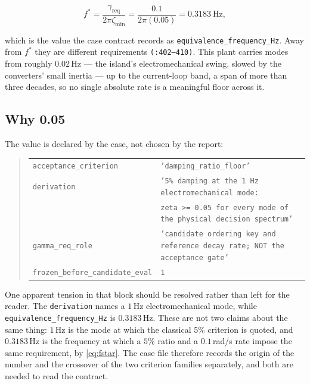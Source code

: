 \documentclass[12pt,a4paper]{article}
\theoremstyle{remark}
\newcommand{\zmin}{\zeta_{\min}}
\newcommand{\greq}{\gamma_{\mathrm{req}}}
\newcommand{\code}[1]{\texttt{\small #1}}
\begin{document}
\begin{equation}
f^{*} = \frac{\greq}{2\pi\zmin} = \frac{0.1}{2\pi(0.05)} = 0.3183\ \mathrm{Hz},
\label{eq:fstar}
\end{equation}

which is the value the case contract records as \code{equivalence\_frequency\_Hz}.
Away from $f^{*}$ they are different requirements \code{(:402--410)}. This plant
carries modes from roughly $0.02$\,Hz --- the island's electromechanical swing,
slowed by the converters' small inertia --- up to the current-loop band, a span
of more than three decades, so no single absolute rate is a meaningful floor
across it.

\subsection{Why 0.05}

The value is declared by the case, not chosen by the report:

\begin{quote}\small
\begin{tabular}{@{}ll@{}}
\code{acceptance\_criterion} & \code{'damping\_ratio\_floor'}\\
\code{derivation} & \code{'5\% damping at the 1\,Hz electromechanical mode:}\\
                 & \code{zeta >= 0.05 for every mode of the physical decision spectrum'}\\
\code{gamma\_req\_role} & \code{'candidate ordering key and reference decay rate; NOT the acceptance gate'}\\
\code{frozen\_before\_candidate\_eval} & \code{1}\\
\end{tabular}
\end{quote}

One apparent tension in that block should be resolved rather than left for the
reader. The \code{derivation} names a $1$\,Hz electromechanical mode, while
\code{equivalence\_frequency\_Hz} is $0.3183$\,Hz. These are not two claims about
the same thing: $1$\,Hz is the mode at which the classical $5\%$ criterion is
quoted, and $0.3183$\,Hz is the frequency at which a $5\%$ ratio and a
$0.1$\,rad/s rate impose the same requirement, by \eqref{eq:fstar}. The case file
therefore records the origin of the number and the crossover of the two
criterion families separately, and both are needed to read the contract.
\end{document}

